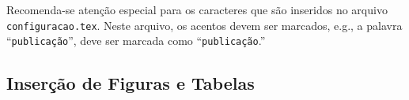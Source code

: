 \documentclass[10pt]{beamer}
\begin{document}
\begin{frame}[plain]{}
    \begin{marker}
        Recomenda-se atenção especial para os caracteres que são inseridos no arquivo {\tt configuracao.tex}. Neste arquivo, os acentos devem ser marcados, e.g., a palavra ``{\tt publicação}'', deve ser marcada como ``\texttt{publicaç\~{a}o}.''
    \end{marker}
\end{frame}

\subsection{Inserção de Figuras e Tabelas}

\end{document}
